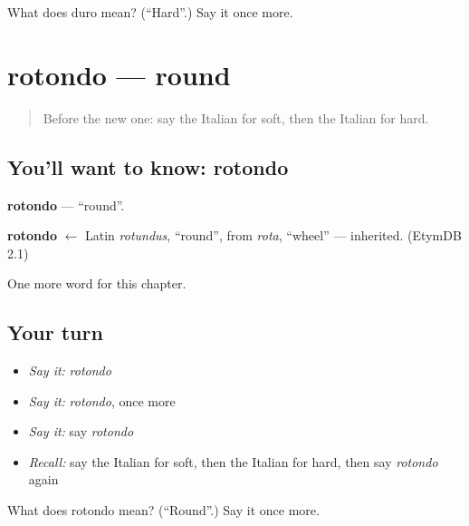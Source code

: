 \begin{tcolorbox}[breakable,colback=teal!4,colframe=teal!35!black,title={Before you move on}]
What does duro mean? (\textquotedblleft{}Hard\textquotedblright{}.) Say it once more.
\end{tcolorbox}
\section[rotondo]{rotondo — round}

\label{lesson:IT-C129-rotondo}



\begin{quote}
Before the new one: say the Italian for soft, then the Italian for hard.
\end{quote}

\subsection*{You'll want to know: rotondo}
\textbf{rotondo} — \textquotedblleft{}round\textquotedblright{}.

\begin{cousinweb}
\textbf{rotondo} $\leftarrow$ Latin \emph{rotundus}, \textquotedblleft{}round\textquotedblright{}, from \emph{rota}, \textquotedblleft{}wheel\textquotedblright{} — inherited. (EtymDB 2.1)
\end{cousinweb}

\begin{grammarlens}[title={What you've built}]
One more word for this chapter.
\end{grammarlens}

\subsection*{Your turn}
\begin{itemize}
\raggedright
  \item \emph{Say it:} \emph{rotondo}
  \item \emph{Say it:} \emph{rotondo}, once more
  \item \emph{Say it:} say \emph{rotondo}
  \item \emph{Recall:} say the Italian for soft, then the Italian for hard, then say \emph{rotondo} again
\end{itemize}

\begin{tcolorbox}[breakable,colback=teal!4,colframe=teal!35!black,title={Before you move on}]
What does rotondo mean? (\textquotedblleft{}Round\textquotedblright{}.) Say it once more.
\end{tcolorbox}
